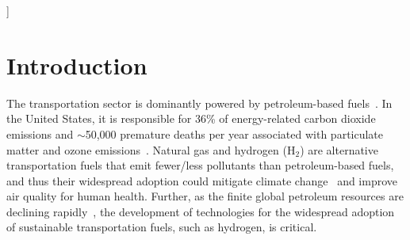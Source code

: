 \documentclass[twoside,twocolumn,9pt]{article}
\begin{document}
  ]

\renewcommand*\rmdefault{bch}\normalfont\upshape
\rmfamily
\section*{}
\vspace{-1cm}







\section{Introduction}
The transportation sector is dominantly powered by petroleum-based
fuels~\cite{davis2009transportation}. In the United States, it is responsible
for 36\% of energy-related carbon dioxide emissions \cite{useia} and $\sim$50,000
premature deaths per year associated with particulate matter and ozone
emissions~\cite{caiazzo2013air}. Natural gas and hydrogen (H$_2$) are
alternative transportation fuels that emit fewer/less pollutants than
petroleum-based fuels, and thus their widespread adoption could mitigate
climate change~\cite{mcglade2015geographical} and improve air quality for human
health. Further, as the finite global petroleum resources are declining
rapidly~\cite{sorrell2010global}, the development of technologies for the
widespread adoption of sustainable transportation fuels, such as hydrogen, is
critical.
\end{document}
